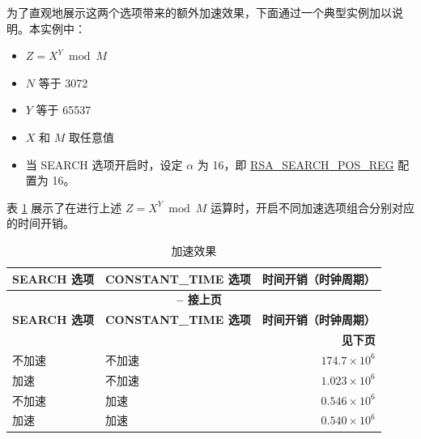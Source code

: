 \documentclass[main\_\_CN.tex]{subfiles}
\begin{document}
为了直观地展示这两个选项带来的额外加速效果，下面通过一个典型实例加以说明。本实例中：
\begin{itemize}
    \item \begin{math}Z = X^{Y} \bmod M\end{math}
    \item \begin{math}N\end{math} 等于 3072
    \item \begin{math}Y\end{math} 等于 65537
    \item \begin{math}X\end{math} 和 \begin{math}M\end{math} 取任意值
    \item 当 SEARCH 选项开启时，设定 \begin{math} \alpha \end{math} 为 16，即 \hyperref[regdesc:RSASEARCHPOSREG]{RSA\_SEARCH\_POS\_REG} 配置为 16。
\end{itemize}

表 \ref{tab:accelerationeffect} 展示了在进行上述 \begin{math}Z = X^{Y} \bmod M\end{math} 运算时，开启不同加速选项组合分别对应的时间开销。

\begin{longtable}{ | l | l | r | }
    \caption{加速效果}\label{tab:accelerationeffect}
    \\\hline
    \rowcolor{lightgray}
    \textbf{SEARCH 选项} & \textbf{CONSTANT\_TIME 选项} & \textbf{时间开销（时钟周期）}  \\ \hline
    \endfirsthead

    \multicolumn{3}{c}{\bfseries \tablename\ \thetable{} -- 接上页}\\\hline

    \rowcolor{lightgray}
    \textbf{SEARCH 选项} & \textbf{CONSTANT\_TIME 选项} & \textbf{时间开销（时钟周期）}  \\ \hline
    \endhead

    \multicolumn{3}{r}{\textbf{见下页}} \\
    \endfoot
    \endlastfoot
    \hline

     不加速 & 不加速 & $174.7 \times 10^6$   \\ \hline
     加速   & 不加速 & $1.023 \times 10^6$   \\ \hline
     不加速 & 加速 & $0.546 \times 10^6$     \\ \hline
     加速   & 加速 & $0.540 \times 10^6$     \\ \hline
\end{longtable}
\end{document}
